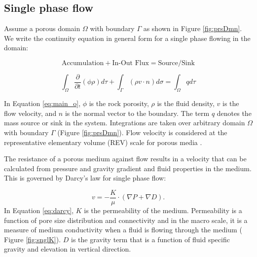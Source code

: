 \subsection{Single phase flow}

Assume a porous domain $\Omega$ with boundary $\Gamma$ as shown in Figure
\ref{fig:prsDmn}. We write the continuity equation in general form for a single
phase flowing in the domain:

\begin{equation}
  \mbox{Accumulation}+\mbox{In-Out Flux} = \mbox{Source/Sink}
  \label{eq:ak}
\end{equation}

\begin{equation}
  \int_{\Omega}\frac{\partial}{\partial t}(\phi\rho)d\tau+\int_{\Gamma}(\rho v
\cdot n)d\sigma=\int_{\Omega}qd\tau
  \label{eq:main_o}
\end{equation}

In Equation \ref{eq:main_o}, $\phi$ is the rock porosity, $\rho$ is the fluid
density, $v$ is the flow velocity, and $n$ is the normal vector to the boundary.
The term $q$ denotes the mass source or sink in the system. Integrations are
taken over arbitrary domain $\Omega$ with boundary $\Gamma$ (Figure
\ref{fig:prsDmn}). Flow velocity is considered at the representative elementary
volume (REV) scale for porous media \cite{bear1988dynamics}.

The resistance of a porous medium against flow results in a velocity that can be
calculated from pressure and gravity gradient and fluid properties in the
medium.
This is governed by Darcy's law for single phase flow:
 
\begin{equation}
  v=-\frac{K}{\mu}\cdot (\nabla{P}+\nabla{D}).
  \label{eq:darcy}
\end{equation} In Equation \ref{eq:darcy}, $K$ is the permeability of the
medium.
Permeability is a function of pore size distribution and connectivity and in the
macro scale, it is a measure of medium conductivity when a fluid is flowing
through the medium ( Figure \ref{fig:snglK}). $D$ is the gravity term that is a
function of fluid specific gravity and elevation in vertical direction. 

